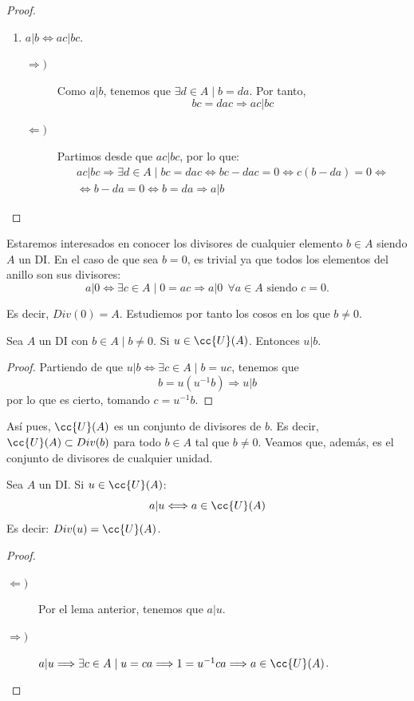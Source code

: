 \begin{proof}
\begin{enumerate}
        \item $a|b \Longleftrightarrow ac|bc$.
        \begin{description}
            \item[$\Longrightarrow)$] Como $a|b$, tenemos que $\exists d \in A \mid b=da$. Por tanto,
                $$bc = dac \Longrightarrow ac|bc$$
            \item[$\Longleftarrow)$] Partimos desde que $ac|bc$, por lo que:
                \begin{multline*}
                    ac|bc \Longrightarrow \exists d \in A \mid bc = dac \Longleftrightarrow bc-dac=0 \Longleftrightarrow c(b-da)=0 \Longleftrightarrow \\
                    \Longleftrightarrow b-da=0 \Longleftrightarrow b = da \Longrightarrow a|b
                \end{multline*}
        \end{description}
    \end{enumerate}
\end{proof}

Estaremos interesados en conocer los divisores de cualquier elemento $b \in A$ siendo $A$ un DI. En el caso de que sea $b=0$, es trivial ya que todos los elementos del anillo son sus divisores:
\begin{equation*}
    a|0 \Longleftrightarrow \exists c \in A \mid 0 = ac \Longrightarrow a|0~~\forall a \in A\text{ siendo } c=0.
\end{equation*}

Es decir, $Div(0)=A$. Estudiemos por tanto los cosos en los que $b\neq 0$.
\begin{lema}
    Sea $A$ un DI con $b \in A \mid b \neq 0$. Si $u \in \cc{U}(A)$. Entonces $u|b$.
\end{lema}
\begin{proof} Partiendo de que $u|b \Longleftrightarrow \exists c\in A \mid b=uc$, tenemos que
    $$b=u(u^{-1}b) \Longrightarrow u|b$$
    por lo que es cierto, tomando $c=u^{-1}b$.
\end{proof}

Así pues, $\cc{U}(A)$ es un conjunto de divisores de $b$. Es decir, $\cc{U}(A)\subset Div(b)$ para todo $b \in A$ tal que $b \neq 0$. Veamos que, además, es el conjunto de divisores de cualquier unidad.
\begin{lema} Sea $A$ un DI. Si $u \in \cc{U}(A)$:
    $$a|u \Longleftrightarrow a \in \cc{U}(A)$$
Es decir: $Div(u) = \cc{U}(A)$.
\end{lema}
\begin{proof}\
\begin{description}
    \item[$\Longleftarrow)$] Por el lema anterior, tenemos que $a|u$.

    \item[$\Longrightarrow)$] $a|u \Longrightarrow \exists c \in A \mid u=ca \Longrightarrow 1=u^{-1}ca \Longrightarrow a \in \cc{U}(A)$.
\end{description}
\end{proof}


